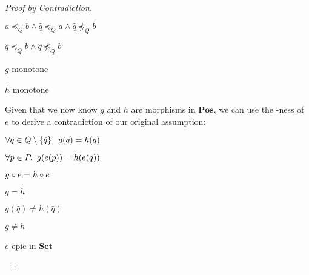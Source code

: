 \begin{lemma}
\begin{proof}[Proof by Contradiction]
\begin{itemize}
\begin{itemize}
          \step[\imps]
            $a\preceq_Qb\wedge \hat{q}\preceq_Qa\wedge \hat{q}\npreceq_Qb$

          \step[\imps]
            $\hat{q}\preceq_Qb\wedge \hat{q}\npreceq_Qb$
        \end{itemize}

      \step[\contras] $g$ monotone
        \marginnote{\Contra}

      \step $h$ monotone

      \addtolength{\itemsep}{.5\baselineskip}
      \step Given that we now know $g$ and $h$ are morphisms in $\mathbf{Pos}$, we can use the \Epic-ness of $e$ to derive a contradiction of our original assumption:

      \step
        \begin{itemize}
          \subp{\dagger}
            $\forall q\in Q\setminus\{\hat{q}\}\ldotp~g(q) = h(q)$

          \step[\imps]
            $\forall p\in P\ldotp~g(e(p)) = h(e(q))$


          \step[\iffs]
            $g\circ e = h\circ e$
            \marginnote{\Def-$=$}

          \step[\imps]
            $g = h$
        \end{itemize}
      \addtolength{\itemsep}{-.5\baselineskip}

      \step
        \begin{itemize}
          \subp{\ddagger}
            $g(\hat{q})\neq h(\hat{q})$

          \step[\imps]
            $g\neq h$
            \marginnote{\Def-$\neq$}
        \end{itemize}

        \step[\contras] $e$ epic in $\mathbf{Set}$
          \qedhere
          \marginnote{\Contra-$\dagger$}
    \end{itemize}
  \end{proof}
\end{lemma}

